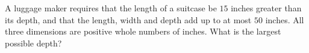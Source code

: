 A luggage maker requires that the length of a suitcase be $15$ inches greater than its depth, and that the length, width and depth add up to at most $50$ inches. All three dimensions are positive whole numbers of inches. What is the largest possible depth?
